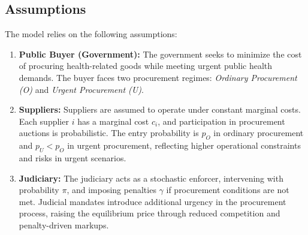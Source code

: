 \documentclass[12pt]{article}
\begin{document}
\subsection{Assumptions}
The model relies on the following assumptions:
\begin{enumerate}
    \item \textbf{Public Buyer (Government):} The government seeks to minimize the cost of procuring health-related goods while meeting urgent public health demands. The buyer faces two procurement regimes: \textit{Ordinary Procurement (O)} and \textit{Urgent Procurement (U)}.
    \item \textbf{Suppliers:} Suppliers are assumed to operate under constant marginal costs. Each supplier \( i \) has a marginal cost \( c_i \), and participation in procurement auctions is probabilistic. The entry probability is \( p_O \) in ordinary procurement and \( p_U < p_O \) in urgent procurement, reflecting higher operational constraints and risks in urgent scenarios.
    \item \textbf{Judiciary:} The judiciary acts as a stochastic enforcer, intervening with probability \( \pi \), and imposing penalties \( \gamma \) if procurement conditions are not met. Judicial mandates introduce additional urgency in the procurement process, raising the equilibrium price through reduced competition and penalty-driven markups.
\end{enumerate}
\end{document}
